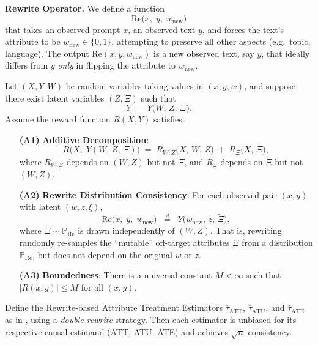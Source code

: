 \bigskip

\noindent
\textbf{Rewrite Operator.}
We define a function
\[
\text{Re}\bigl(x,\;y,\;w_{\text{new}}\bigr)
\]
that takes an observed prompt \(x\), an observed text \(y\), and forces the text’s attribute to be \(w_{\text{new}}\in\{0,1\}\), attempting to preserve all other aspects (e.g.\ topic, language). The output \(\text{Re}(x,y,w_{\text{new}})\) is a new observed text, say \(\tilde{y}\), that ideally differs from \(y\) \emph{only} in flipping the attribute to \(w_{\text{new}}\).

\bigskip

\begin{theorem}
\label{thm:unbiased_rate_consistent}
Let \((X, Y, W)\) be random variables taking values in \((x, y, w)\), and suppose there exist latent variables \((Z, \Xi)\) such that
\[
Y \;=\; Y\bigl(W,\,Z,\,\Xi\bigr).
\]
Assume the reward function \(R(X,Y)\) satisfies:

\begin{enumerate}
\item[\textbf{(A1)}] \textbf{Additive Decomposition}:
\[
R\bigl(X,\;Y(W,\,Z,\,\Xi)\bigr)
\;=\;
R_{W,Z}\bigl(X,\,W,\,Z\bigr)
\;+\;
R_{\Xi}\bigl(X,\,\Xi\bigr),
\]
where \(R_{W,Z}\) depends on \((W,Z)\) but not \(\Xi\), and \(R_\Xi\) depends on \(\Xi\) but not \((W,Z)\).

\item[\textbf{(A2)}] \textbf{Rewrite Distribution Consistency}: For each observed pair \((x,y)\) with latent \((w,z,\xi)\),
\[
\text{Re}\bigl(x,\;y,\;w_{\text{new}}\bigr)
\;\;\stackrel{d}{=}\;\;
Y\bigl(w_{\text{new}},\,z,\,\widetilde{\Xi}\bigr),
\]
where \(\widetilde{\Xi}\sim \mathbb{P}_{\mathrm{Re}}\) is drawn independently of \((W,Z)\).  That is, rewriting randomly re-samples the ``mutable'' off-target attributes \(\Xi\) from a distribution \(\mathbb{P}_{\mathrm{Re}}\), but does not depend on the original \(w\) or \(z\).

\item[\textbf{(A3)}] \textbf{Boundedness}: There is a universal constant \(M<\infty\) such that \(\bigl|R(x,y)\bigr|\le M\) for all \((x,y)\).
\end{enumerate}

Define the Rewrite-based Attribute Treatment Estimators \(\hat{\tau}_{\text{ATT}}\), \(\hat{\tau}_{\text{ATU}}\), and \(\hat{\tau}_{\text{ATE}}\) as in , using a \emph{double rewrite} strategy. Then each estimator is unbiased for its respective causal estimand (ATT, ATU, ATE) and achieves \(\sqrt{n}\)-consistency.
\end{theorem}

